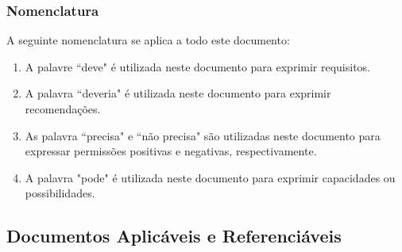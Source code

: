\subsubsection{Nomenclatura}

A seguinte nomenclatura se aplica a todo este documento:
\begin{enumerate}[label=\alph*.]
    \item A palavre ``deve" é utilizada neste documento para exprimir requisitos.
    \item A palavra ``deveria" é utilizada neste documento para exprimir recomendações.
    \item As palavra ``precisa" e ``não precisa" são utilizadas neste documento para expressar permissões positivas e negativas, respectivamente.
    \item A palavra "pode" é utilizada neste documento para exprimir capacidades ou possibilidades.
\end{enumerate}

\subsection{Documentos Aplicáveis e Referenciáveis}
